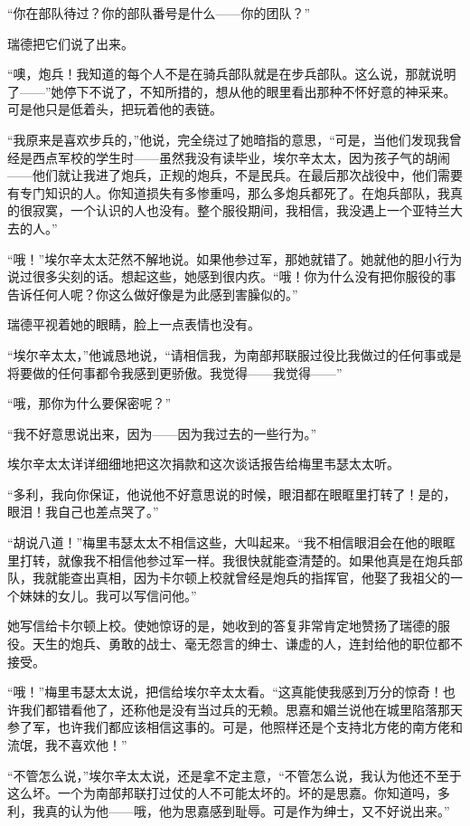 \par “你在部队待过？你的部队番号是什么——你的团队？”
\par 瑞德把它们说了出来。
\par “噢，炮兵！我知道的每个人不是在骑兵部队就是在步兵部队。这么说，那就说明了——”她停下不说了，不知所措的，想从他的眼里看出那种不怀好意的神采来。可是他只是低着头，把玩着他的表链。
\par “我原来是喜欢步兵的，”他说，完全绕过了她暗指的意思，“可是，当他们发现我曾经是西点军校的学生时——虽然我没有读毕业，埃尔辛太太，因为孩子气的胡闹——他们就让我进了炮兵，正规的炮兵，不是民兵。在最后那次战役中，他们需要有专门知识的人。你知道损失有多惨重吗，那么多炮兵都死了。在炮兵部队，我真的很寂寞，一个认识的人也没有。整个服役期间，我相信，我没遇上一个亚特兰大去的人。”
\par “哦！”埃尔辛太太茫然不解地说。如果他参过军，那她就错了。她就他的胆小行为说过很多尖刻的话。想起这些，她感到很内疚。“哦！你为什么没有把你服役的事告诉任何人呢？你这么做好像是为此感到害臊似的。”
\par 瑞德平视着她的眼睛，脸上一点表情也没有。
\par “埃尔辛太太，”他诚恳地说，“请相信我，为南部邦联服过役比我做过的任何事或是将要做的任何事都令我感到更骄傲。我觉得——我觉得——”
\par “哦，那你为什么要保密呢？”
\par “我不好意思说出来，因为——因为我过去的一些行为。”
\par 埃尔辛太太详详细细地把这次捐款和这次谈话报告给梅里韦瑟太太听。
\par “多利，我向你保证，他说他不好意思说的时候，眼泪都在眼眶里打转了！是的，眼泪！我自己也差点哭了。”
\par “胡说八道！”梅里韦瑟太太不相信这些，大叫起来。“我不相信眼泪会在他的眼眶里打转，就像我不相信他参过军一样。我很快就能查清楚的。如果他真是在炮兵部队，我就能查出真相，因为卡尔顿上校就曾经是炮兵的指挥官，他娶了我祖父的一个妹妹的女儿。我可以写信问他。”
\par 她写信给卡尔顿上校。使她惊讶的是，她收到的答复非常肯定地赞扬了瑞德的服役。天生的炮兵、勇敢的战士、毫无怨言的绅士、谦虚的人，连封给他的职位都不接受。
\par “哦！”梅里韦瑟太太说，把信给埃尔辛太太看。“这真能使我感到万分的惊奇！也许我们都错看他了，还称他是没有当过兵的无赖。思嘉和媚兰说他在城里陷落那天参了军，也许我们都应该相信这事的。可是，他照样还是个支持北方佬的南方佬和流氓，我不喜欢他！”
\par “不管怎么说，”埃尔辛太太说，还是拿不定主意，“不管怎么说，我认为他还不至于这么坏。一个为南部邦联打过仗的人不可能太坏的。坏的是思嘉。你知道吗，多利，我真的认为他——哦，他为思嘉感到耻辱。可是作为绅士，又不好说出来。”
